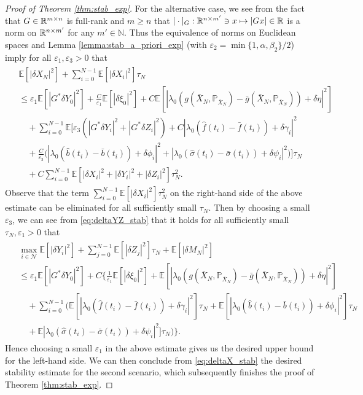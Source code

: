 \documentclass[11pt]{article}
\numberwithin{equation}{section}
\theoremstyle{definition}
\theoremstyle{remark}
\def\b{\beta}  \def\a{\alpha} \def\ga{\gamma}
\def\eps{\varepsilon}
\def\cN{\mathcal{N}}
\def\sE{{\mathbb{E}}}
\def\sN{{\mathbb{N}}}
\def\sP{\mathbb{P}}
\def\sR{{\mathbb R}}
\begin{document}
\begin{proof}[Proof of Theorem \ref{thm:stab_exp}]
For the alternative case, 
we see from the fact that $G\in \sR^{m\t n}$ is full-rank
and $m\ge n$ that
$|\cdot|_{G}: \sR^{n\t m'}\ni x\mapsto |Gx|\in \sR $ is a norm on $\sR^{n\t m'}$ for any $m'\in \sN$.
Thus the equivalence of norms on Euclidean spaces
and Lemma  \ref{lemma:stab_a_priori_exp}  (with $\eps_2={\min\{1,\a,\b_2\}}/{2}$)
imply for all $\eps_1,\eps_3>0$  that
\begin{align*}
\begin{split}
& \sE[
|\delta X_{N}|^2]
+
 \sum_{i=0}^{N-1}
  \sE[
|\delta X_{i}|^2
 ]\tau_N
\\
& \le
\eps_1\sE[ |G^*\delta Y_0|^2]
+\frac{C}{\eps_1}\sE[ | \delta \xi_0|^2]
+
C\sE[ |\lambda_0(g(\bar{X}_N,\sP_{\bar{X}_N})-\bar{g}(\bar{X}_N,\sP_{\bar{X}_N}))
+\delta \eta|^2]
\\
&\quad
 +\sum_{i=0}^{N-1}
 \sE\bigg[
\eps_3 (|G^*\delta Y_{i}|^2+| G^*\delta  {Z}_i|^2)
+{C}
|
\lambda _0
(\hat{f}(t_{i})-\bar{f}(t_{i}))+\delta \gamma_i|^2
\\
& \quad
+
\frac{C}{\eps_3}
\bigg(
 |
 \lambda_0(
 \hat{b}(t_{i})-\bar{b}(t_{i}))+\delta \phi_{i}|^2
 +
 | 
 \lambda_0( \hat{\sigma}(t_i)-\bar{\sigma}(t_i))+\delta \psi_{i}|^2
 \bigg) \bigg]\tau_N
 \\
& \quad
 +C\sum_{i=0}^{N-1}
 \sE[|  \delta X_i|^2+|\delta Y_{i}|^2+| \delta  {Z}_i|^2]\tau^2_N.
\end{split}
\end{align*}
Observe that the term $\sum_{i=0}^{N-1}
 \sE[|  \delta X_i|^2]\tau^2_N$ on the right-hand side of the above estimate can be eliminated for all sufficiently small $\tau_N$.
Then by choosing a small $\eps_3$, we can see from \eqref{eq:deltaYZ_stab} that
it holds for all sufficiently small $\tau_N,\eps_1>0$ that
\begin{align*}
\begin{split}
&\max_{i\in \cN}\sE[|\delta Y_i|^2]+\sum_{j=0}^{N-1}\sE[| \delta {Z}_j|^2]\tau_N+\sE[|\delta {M}_N|^2]
\\
&\le
 \eps_1\sE[ |G^*\delta Y_0|^2]
+C
\bigg\{
\frac{1}{\eps_1}\sE[|\delta \xi_{0}|^2]
+
\sE[ |\lambda_0(g(\bar{X}_N,\sP_{\bar{X}_N})-\bar{g}(\bar{X}_N,\sP_{\bar{X}_N}))
+\delta \eta|^2]
\\
&\quad
+\sum_{i=0}^{N-1}
\bigg(
\sE[|\lambda_0(\hat{f}(t_{i})-\bar{f}(t_{i}))+\delta \gamma_i|^2]\tau_N
+
\sE[|\lambda_0(\hat{b}(t_{i})-\bar{b}(t_{i}))+\delta \phi_{i}|^2]\tau_N
\\
&
\quad 
+
\sE|\lambda_0(\hat{\sigma}(t_i)-\bar{\sigma}(t_i))+\delta \psi_{i}|^2]\tau_N
\bigg)
\bigg\}.
   \end{split}
\end{align*}
Hence  choosing a small $\eps_1$ in the above estimate
gives us the desired upper bound for 
the left-hand side.
We can then conclude from 
\eqref{eq:deltaX_stab}
the desired stability estimate for the  second scenario,
which subsequently finishes the proof of Theorem \ref{thm:stab_exp}.
\end{proof}
\end{document}
